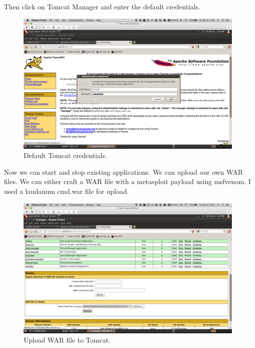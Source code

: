 \documentclass{article}
\begin{document}
\newpage
Then click on Tomcat Manager and enter the default credentials.

\begin{figure}[h!]
	\includegraphics[width=\linewidth]{images/tomcat-metasploitable-credentials.png}
	\caption{Default Tomcat credentials.}
	\label{fig:tomcat-injection2}
\end{figure}

\newpage
Now we can start and stop existing applications. We can upload our own WAR files.
We can either craft a WAR file with a metasploit payload using msfvenom. 
I used a laudanum cmd.war file for upload.


\begin{figure}[h!]
	\includegraphics[width=\linewidth]{images/tomcat-metasploitable-upload.png}
	\caption{Upload WAR file to Tomcat.}
	\label{fig:tomcat-injection4}
\end{figure}
\end{document}
